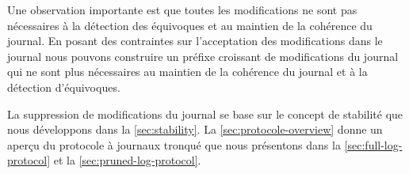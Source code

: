 Une observation importante est que toutes les modifications ne sont pas nécessaires à la détection des équivoques et au maintien de la cohérence du journal.
En posant des contraintes sur l'acceptation des modifications dans le journal nous pouvons construire un préfixe croissant de modifications du journal qui ne sont plus nécessaires au maintien de la cohérence du journal et à la détection d'équivoques.

La suppression de modifications du journal se base sur le concept de stabilité que nous développons dans la \autoref{sec:stability}.
La \autoref{sec:protocole-overview} donne un aperçu du protocole à journaux tronqué que nous présentons dans la \autoref{sec:full-log-protocol} et la \autoref{sec:pruned-log-protocol}.


